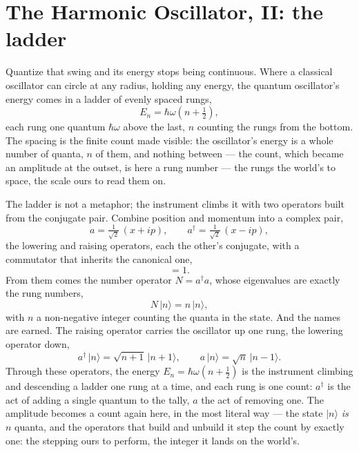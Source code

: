 \section{The Harmonic Oscillator, II: the ladder}
\label{se:oscillator-ladder}

Quantize that swing and its energy stops being continuous. Where a classical oscillator can circle at any
radius, holding any energy, the quantum oscillator's energy comes in a ladder of evenly spaced rungs,
\begin{equation}
  E_n = \hbar\omega\left(n + \tfrac12\right),
\end{equation}
each rung one quantum $\hbar\omega$ above the last, $n$ counting the rungs from the bottom. The spacing is the
finite count made visible: the oscillator's energy is a whole number of quanta, $n$ of them, and nothing
between --- the count, which became an amplitude at the outset, is here a rung number --- the rungs the
world's to space, the scale ours to read them on.

The ladder is not a metaphor; the instrument climbs it with two operators built from the conjugate pair.
Combine position and momentum into a complex pair,
\begin{equation}
  a = \tfrac{1}{\sqrt2}\,(x + i p), \qquad a^\dagger = \tfrac{1}{\sqrt2}\,(x - i p),
\end{equation}
the lowering and raising operators, each the other's conjugate, with a commutator that inherits the
canonical one,
\begin{equation}
  [\,a, a^\dagger\,] = 1 .
\end{equation}
From them comes the number operator $N = a^\dagger a$, whose eigenvalues are exactly the rung numbers,
\begin{equation}
  N\,\lvert n\rangle = n\,\lvert n\rangle,
\end{equation}
with $n$ a non-negative integer counting the quanta in the state. And the names are earned. The raising
operator carries the oscillator up one rung, the lowering operator down,
\begin{equation}
  a^\dagger\,\lvert n\rangle = \sqrt{n+1}\,\lvert n+1\rangle, \qquad
  a\,\lvert n\rangle = \sqrt{n}\,\lvert n-1\rangle .
\end{equation}
Through these operators, the energy $E_n = \hbar\omega(n + \tfrac12)$ is the instrument climbing and
descending a ladder one rung at a time, and each rung is one count: $a^\dagger$ is the act of adding a single
quantum to the tally, $a$ the act of removing one. The amplitude becomes a count again here, in the most
literal way --- the state $\lvert n\rangle$ \emph{is} $n$ quanta, and the operators that build and unbuild it
step the count by exactly one: the stepping ours to perform, the integer it lands on the world's.


